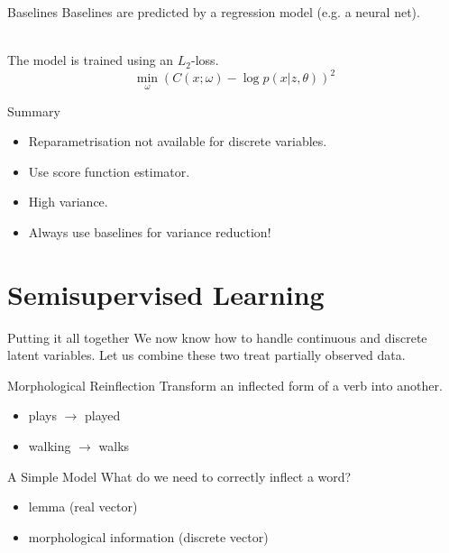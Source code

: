 \documentclass[14pt]{beamer}
\begin{document}
\begin{frame}{Baselines}
Baselines are predicted by a regression model (e.g. a neural net). \\

~

The model is trained using 
an $ L_{2} $-loss.
\begin{equation*}
\min_\omega \left(C(x; \omega) - \log p(x|z,\theta)\right)^{2}
\end{equation*}
\end{frame}

\begin{frame}{Summary}
\begin{itemize}
\pause
\item Reparametrisation not available for discrete variables.
\pause
\item Use score function estimator.
\pause
\item High variance.
\pause
\item Always use baselines for variance reduction!
\end{itemize}
\end{frame}

\section{Semisupervised Learning}

\begin{frame}{Putting it all together}
We now know how to handle continuous and discrete latent variables. Let us combine these two treat partially observed data.
\pause
\begin{block}{Morphological Reinflection}
Transform an inflected form of a verb into another.
\begin{itemize}
\pause
\item plays $ \rightarrow $ played
\pause
\item walking $ \rightarrow $ walks
\end{itemize}
\end{block}
\end{frame}

\begin{frame}{A Simple Model \citep{ZhouNeubig:2017}}
What do we need to correctly inflect a word?
\pause
\begin{itemize}
\item lemma \pause (real vector)
\pause
\item morphological information \pause (discrete vector)
\end{itemize}
\end{frame}
\end{document}
